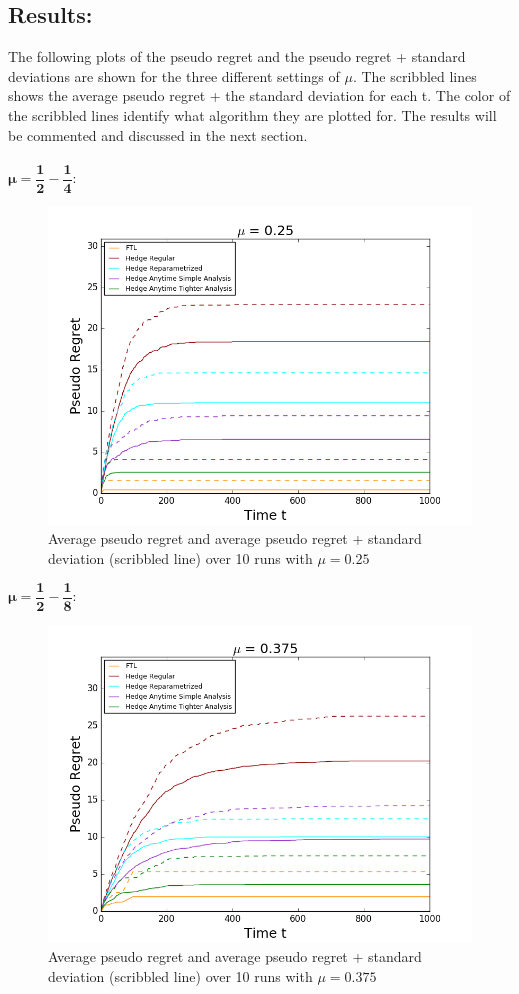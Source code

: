 \documentclass{article}
\begin{document}
\subsection{Results:}
The following plots of the pseudo regret and the pseudo regret + standard deviations are shown for the three different settings of $\mu$. The scribbled lines shows the average pseudo regret + the standard deviation for each t. The color of the scribbled lines identify what algorithm they are plotted for. The results will be commented and discussed in the next section.\\ \\
$\mathbf{\mu = \dfrac{1}{2} - \dfrac{1}{4}} $:
\begin{figure}[H]
 \centering
  \includegraphics[width=17cm]{fig/0_new.png}
  \caption{\footnotesize Average pseudo regret and average pseudo regret + standard deviation (scribbled line) over 10 runs with $\mu = 0.25$ }
\label{fig:1}
\end{figure}
$\mathbf{\mu = \dfrac{1}{2} - \dfrac{1}{8}} $:
\begin{figure}[H]
 \centering
  \includegraphics[width=17cm]{fig/1_new.png}
  \caption{\footnotesize Average pseudo regret and average pseudo regret + standard deviation (scribbled line) over 10 runs with $\mu = 0.375$ }
\label{fig:2}
\end{figure}
\end{document}
